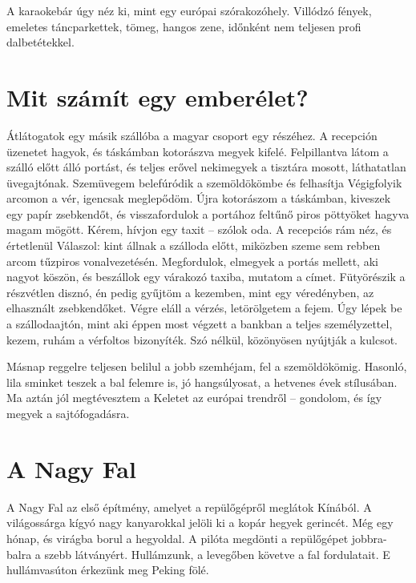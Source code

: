 A karaokebár úgy néz ki, mint egy európai szórakozóhely. Villódzó
fények, emeletes táncparkettek, tömeg, hangos zene, időnként nem
teljesen profi dalbetétekkel.

\section{Mit számít egy emberélet?}

Átlátogatok egy másik szállóba a magyar csoport egy részéhez. A recepción
üzenetet hagyok, és táskámban kotorászva megyek kifelé. Felpillantva látom
a szálló előtt álló portást, és teljes erővel nekimegyek
a tisztára mosott, láthatatlan üvegajtónak. Szemüvegem belefúródik
a szemöldökömbe és felhasítja Végigfolyik arcomon a vér, igencsak
meglepődöm. Újra kotorászom a táskámban, kiveszek egy papír zsebkendőt,
és visszafordulok a portához feltűnő piros pöttyöket hagyva
magam mögött. Kérem, hívjon egy taxit -- szólok oda. A recepciós rám
néz, és értetlenül Válaszol: kint állnak a szálloda előtt, miközben szeme
sem rebben arcom tűzpiros vonalvezetésén. Megfordulok, elmegyek a
portás mellett, aki nagyot köszön, és beszállok egy várakozó taxiba,
mutatom a címet. Fütyörészik a részvétlen disznó, én pedig gyűjtöm a
kezemben, mint egy véredényben, az elhasznált zsebkendőket. Végre
eláll a vérzés, letörölgetem a fejem. Úgy lépek be a szállodaajtón, mint
aki éppen most végzett a bankban a teljes személyzettel, kezem, ruhám
a vérfoltos bizonyíték. Szó nélkül, közönyösen nyújtják a kulcsot.

Másnap reggelre teljesen belilul a jobb szemhéjam, fel a szemöldökömig.
Hasonló, lila sminket teszek a bal felemre is, jó hangsúlyosat,
a hetvenes évek stílusában. Ma aztán jól megtévesztem a Keletet az
európai trendről -- gondolom, és így megyek a sajtófogadásra.

\section{A Nagy Fal}

A Nagy Fal az első építmény, amelyet a repülőgépről meglátok Kínából.
A világossárga kígyó nagy kanyarokkal jelöli ki a kopár hegyek gerincét.
Még egy hónap, és virágba borul a hegyoldal. A pilóta megdönti a
repülőgépet jobbra-balra a szebb látványért. Hullámzunk, a levegőben
követve a fal fordulatait. E hullámvasúton érkezünk meg Peking fölé.

